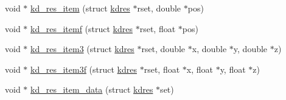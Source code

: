 \begin{DoxyCompactItemize}
\item 
void $\ast$ \hyperlink{a00013_a0028b892251544f9dd78922826c69bc4_a0028b892251544f9dd78922826c69bc4}{kd\-\_\-res\-\_\-item} (struct \hyperlink{a00010}{kdres} $\ast$rset, double $\ast$pos)
\item 
void $\ast$ \hyperlink{a00013_a6e98d639232bb40f5406d3fcd52dbcef_a6e98d639232bb40f5406d3fcd52dbcef}{kd\-\_\-res\-\_\-itemf} (struct \hyperlink{a00010}{kdres} $\ast$rset, float $\ast$pos)
\item 
void $\ast$ \hyperlink{a00013_ab77642dadd394c79265f9426c69ab21b_ab77642dadd394c79265f9426c69ab21b}{kd\-\_\-res\-\_\-item3} (struct \hyperlink{a00010}{kdres} $\ast$rset, double $\ast$x, double $\ast$y, double $\ast$z)
\item 
void $\ast$ \hyperlink{a00013_afd9a5a7217f76209cff1504d7fc687fe_afd9a5a7217f76209cff1504d7fc687fe}{kd\-\_\-res\-\_\-item3f} (struct \hyperlink{a00010}{kdres} $\ast$rset, float $\ast$x, float $\ast$y, float $\ast$z)
\item 
void $\ast$ \hyperlink{a00013_abbff3a82caa304688020bc050d474d30_abbff3a82caa304688020bc050d474d30}{kd\-\_\-res\-\_\-item\-\_\-data} (struct \hyperlink{a00010}{kdres} $\ast$set)
\end{DoxyCompactItemize}


